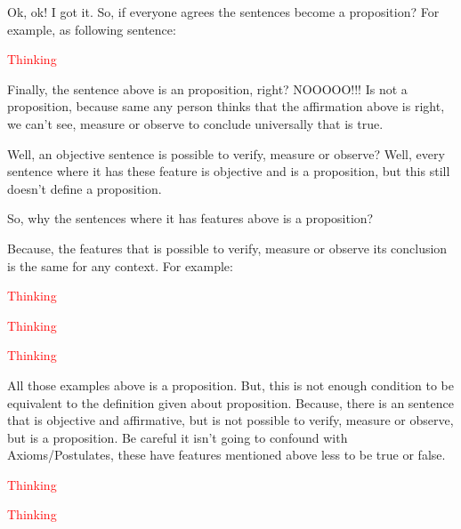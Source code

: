 Ok, ok! I got it. So, if everyone agrees the sentences become a proposition? For example, as following sentence:

\begin{example}[\textcolor{red}{A sentence that is subjective and everyone agree (this is very difficult)}]
    \textcolor{red}{Thinking}
\end{example}

Finally, the sentence above is an proposition, right? NOOOOO!!! Is not a proposition, because same any person thinks that the affirmation above is right, we can't see, measure or observe to conclude universally that is true.

Well, an objective sentence is possible to verify, measure or observe? Well, every sentence where it has these feature is objective and is a proposition, but this still doesn't define a proposition.

So, why the sentences where it has features above is a proposition?

Because, the features that is possible to verify, measure or observe its conclusion is the same for any context. For example:

\begin{example}
    \textcolor{red}{Thinking}
\end{example}

\begin{example}
    \textcolor{red}{Thinking}
\end{example}

\begin{example}
    \textcolor{red}{Thinking}
\end{example}

All those examples above is a proposition. But, this is not enough condition to be equivalent to the definition given about proposition. Because, there is an sentence that is objective and affirmative, but is not possible to verify, measure or observe, but is a proposition. Be careful it isn't going to confound with Axioms/Postulates, these have features mentioned above less to be true or false.

\begin{example}
    \textcolor{red}{Thinking}
\end{example}

\begin{example}
    \textcolor{red}{Thinking}
\end{example}

